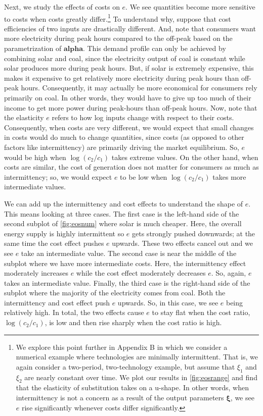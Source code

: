 \documentclass[11pt,a4paper,leqno]{extarticle}
\begin{document}
	Next, we study the effects of costs on $e$. We see quantities become more sensitive to costs when costs greatly differ.\footnote{We explore this point further in Appendix B in which we consider a numerical example where technologies are minimally intermittent. That is, we again consider a two-period, two-technology example, but assume that $\xi_1$ and $\xi_2$ are nearly constant over time. We plot our results in \autoref{fig:eosrange} and find that the elasticity of substitution takes on a u-shape. In other words, when intermittency is not a concern as a result of the output parameters $\boldsymbol{\xi}$, we see $e$ rise significantly whenever costs differ significantly. 
	} To understand why, suppose that cost efficiencies of two inputs are drastically different. And, note that consumers want more electricity during peak hours compared to the off-peak based on the parametrization of $\boldsymbol{alpha}$. This demand profile can only be achieved by combining solar and coal, since the electricity output of coal is constant while solar produces more during peak hours. But, if solar is extremely expensive, this makes it expensive to get relatively more electricity during peak hours than off-peak hours.  Consequently, it may actually be more economical for consumers rely primarily on coal. In other words, they would have to give up too much of their income to get more power during peak-hours than off-peak hours.  Now, note that the elasticity $e$ refers to how log inputs change with respect to their costs. Consequently, when costs are very different, we would expect that small changes in costs would do much to change quantities, since costs (as opposed to other factors like intermittency) are primarily driving the market equilibrium. So, $e$ would be high when $\log(c_2/c_1)$ takes extreme values. On the other hand, when costs are similar, the cost of generation does not matter for consumers as much as intermittency; so, we would expect $e$ to be low when $\log(c_2/c_1)$ takes more intermediate values. 
	
	We can add up the intermittency and cost effects to understand the shape of $e$. This means looking at three cases. The first case is the left-hand side of the second subplot of \autoref{fig:eosnum} where solar is much cheaper. Here, the overall energy supply is highly intermittent so $e$ gets strongly pushed downwards; at the same time the cost effect pushes $e$ upwards. These two effects cancel out and we see $e$ take an intermediate value. The second case is near the middle of the subplot where we have more intermediate costs. Here, the intermittency effect moderately increases $e$ while the cost effect moderately decreases $e$. So, again, $e$ takes an intermediate value. Finally, the third case is the right-hand side of the subplot where the majority of the electricity comes from coal. Both the intermittency and cost effect push $e$ upwards. So, in this case, we see $e$ being relatively high. In total, the two effects cause $e$ to stay flat when the cost ratio, $\log(c_2/c_1)$, is low and then rise sharply when the cost ratio is high. 
	
\end{document}
